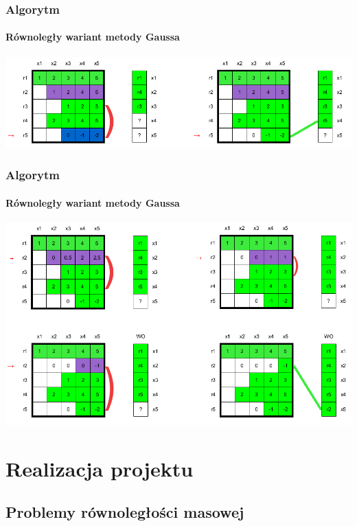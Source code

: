\documentclass{beamer}
\begin{document}
\begin{frame}
\frametitle{Algorytm}
\framesubtitle{Równoległy wariant metody Gaussa}
\hfill\includegraphics[scale=0.45]{faza2a_conflictResolution.png}\hspace*{\fill}
\end{frame}

\begin{frame}
\frametitle{Algorytm}
\framesubtitle{Równoległy wariant metody Gaussa}
\hfill\includegraphics[scale=0.45]{faza2b_conflictResolution.png}\hspace*{\fill}
\end{frame}

\section{Realizacja projektu}
\subsection{Problemy równoległości masowej}
\end{document}
